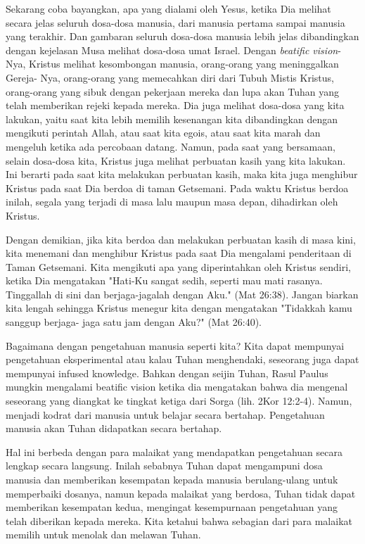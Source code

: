Sekarang coba bayangkan, apa yang dialami oleh Yesus, ketika Dia melihat secara
jelas seluruh dosa-dosa manusia, dari manusia pertama sampai manusia yang
terakhir. Dan gambaran seluruh dosa-dosa manusia lebih jelas dibandingkan
dengan kejelasan Musa melihat dosa-dosa umat Israel. Dengan \textit{beatific vision}-
Nya, Kristus melihat kesombongan manusia, orang-orang yang meninggalkan Gereja-
Nya, orang-orang yang memecahkan diri dari Tubuh Mistis Kristus, orang-orang
yang sibuk dengan pekerjaan mereka dan lupa akan Tuhan yang telah memberikan
rejeki kepada mereka. Dia juga melihat dosa-dosa yang kita lakukan, yaitu saat
kita lebih memilih kesenangan kita dibandingkan dengan mengikuti perintah
Allah, atau saat kita egois, atau saat kita marah dan mengeluh ketika ada
percobaan datang. Namun, pada saat yang bersamaan, selain dosa-dosa kita,
Kristus juga melihat perbuatan kasih yang kita lakukan. Ini berarti pada saat
kita melakukan perbuatan kasih, maka kita juga menghibur Kristus pada saat Dia
berdoa di taman Getsemani. Pada waktu Kristus berdoa inilah, segala yang
terjadi di masa lalu maupun masa depan, dihadirkan oleh Kristus. 

Dengan
demikian, jika kita berdoa dan melakukan perbuatan kasih di masa kini, kita
menemani dan menghibur Kristus pada saat Dia mengalami penderitaan di Taman
Getsemani. Kita mengikuti apa yang diperintahkan oleh Kristus sendiri, ketika
Dia mengatakan "Hati-Ku sangat sedih, seperti mau mati rasanya. Tinggallah di
sini dan berjaga-jagalah dengan Aku." (Mat 26:38). Jangan biarkan kita lengah
sehingga Kristus menegur kita dengan mengatakan "Tidakkah kamu sanggup berjaga-
jaga satu jam dengan Aku?" (Mat 26:40).

Bagaimana dengan pengetahuan manusia seperti kita? Kita dapat mempunyai
pengetahuan eksperimental atau kalau Tuhan menghendaki, seseorang juga dapat
mempunyai infused knowledge. Bahkan dengan seijin Tuhan, Rasul Paulus mungkin
mengalami beatific vision ketika dia mengatakan bahwa dia mengenal seseorang
yang diangkat ke tingkat ketiga dari Sorga (lih. 2Kor 12:2-4). Namun, menjadi
kodrat dari manusia untuk belajar secara bertahap. Pengetahuan manusia akan
Tuhan didapatkan secara bertahap. 

Hal ini berbeda dengan para malaikat yang
mendapatkan pengetahuan secara lengkap secara langsung. Inilah sebabnya Tuhan
dapat mengampuni dosa manusia dan memberikan kesempatan kepada manusia
berulang-ulang untuk memperbaiki dosanya, namun kepada malaikat yang berdosa,
Tuhan tidak dapat memberikan kesempatan kedua, mengingat kesempurnaan
pengetahuan yang telah diberikan kepada mereka. Kita ketahui bahwa sebagian
dari para malaikat memilih untuk menolak dan melawan Tuhan.


